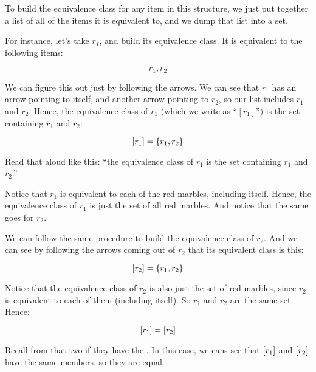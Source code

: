 \documentclass[../../../main.tex]{subfiles}
\begin{document}
To build the equivalence class for any item in this structure, we just put together a list of all of the items it is equivalent to, and we dump that list into a set. 

For instance, let's take $r_{1}$, and build its equivalence class. It is equivalent to the following items:

\begin{equation*}
  r_{1}, r_{2}
\end{equation*}

We can figure this out just by following the arrows. We can see that $r_{1}$ has an arrow pointing to itself, and another arrow pointing to $r_{2}$, so our list includes $r_{1}$ and $r_{2}$. Hence, the equivalence class of $r_{1}$ (which we write as ``$[r_{1}]$'') is the set containing $r_{1}$ and $r_{2}$:

\begin{equation*}
  [r_{1}] = \{ r_{1}, r_{2} \}
\end{equation*}

Read that aloud like this: ``the equivalence class of $r_{1}$ is the set containing $r_{1}$ and $r_{2}$.''

\begin{aside}
  \begin{remark}
    Notice that $r_{1}$ is equivalent to each of the red marbles, including itself. Hence, the equivalence class of $r_{1}$ is just the set of all red marbles. And notice that the same goes for $r_{2}$.
  \end{remark}
\end{aside}

We can follow the same procedure to build the equivalence class of $r_{2}$. And we can see by following the arrows coming out of $r_{2}$ that its equivalent class is this:

\begin{equation*}
  [r_{2}] = \{ r_{1}, r_{2} \}
\end{equation*}

Notice that the equivalence class of $r_{2}$ is also just the set of red marbles, since $r_{2}$ is equivalent to each of them (including itself). So $r_{1}$ and $r_{2}$ are the same set. Hence:

\begin{equation*}
  [r_{1}] = [r_{2}]
\end{equation*}

\begin{aside}
  \begin{remark}
    Recall from  that two  if they have the . In this case, we cans see that $[r_{1}]$ and $[r_{2}]$ have the same members, so they are equal.
  \end{remark}
\end{aside}
\end{document}
